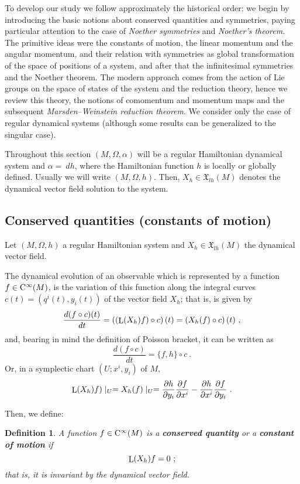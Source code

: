 \documentclass[12pt]{report}
\newtheorem{definition}[teor]{Definition}
\def\derpar#1#2{\frac{\partial{#1}}{\partial{#2}}}
\def\vf{\mathfrak X}
\def\Lie{\mathop{\rm L}\nolimits}
\def\Cinfty{{\rm C}^\infty}
\begin{document}
To develop our study we follow approximately the historical order: 
we begin by introducing the basic notions about conserved quantities 
and symmetries, paying particular attention to the case of 
{\sl Noether symmetries} and {\sl Noether's theorem}. The primitive ideas were the constants of motion, the linear momentum and the angular momentum, and their relation with symmetries as global transformation of the space of positions of a system, and after that the infinitesimal symmetries and the Noether theorem. The modern approach comes from the action of Lie groups on the space of states of the system and the reduction theory, hence we review this theory, the notions of comomentum and momentum maps and the subsequent {\sl Marsden--Weinstein reduction theorem}.
We consider only the case of regular dynamical systems 
(although some results can be generalized to the singular case). 

Throughout this section $(M,\Omega,\alpha)$ will be
a regular Hamiltonian dynamical system and $\alpha=\ d h$, where the Hamiltonian function $h$ is locally or globally defined.
Usually we will write $(M,\Omega,h)$.
Then, $X_h\in\vf_{lh}(M)$ denotes the dynamical vector field
solution to the system.


\subsection{Conserved quantities (constants of motion)}
\label{conquan}


Let $(M,\Omega,h)$ a regular Hamiltonian system and $X_h\in\vf_{lh}(M)$ the dynamical vector field. 

The dynamical evolution of an observable which is represented
by a function $f \in \Cinfty (M)$,
is the variation of this function along the integral curves 
$c(t)=(q^i(t),y_i(t))$ of the vector field $X_h$; that is, is given by
$$
\frac{d (f\circ c)(t)}{d t} = \left(\left(\Lie (X_h)f\right)\circ c\right)(t)=\left(X_h(f)\circ c\right)(t) \ ,
$$
and, bearing in mind the definition of Poisson bracket, it can be written as
$$
\frac{d (f\circ c)}{d t} = \{ f,h \}\circ c \ .
$$
Or, in a symplectic chart $(U;x^i,y_i)$ of $M$, 
$$
\Lie (X_h)f)\mid_U=X_h(f)\mid_U = \derpar{h}{y_i}\derpar{f}{x^i}-\derpar{h}{x^i}\derpar{f}{y_i} \ .
$$

Then, we define:

\begin{definition}
A function $f \in \Cinfty (M)$ is a \textbf{conserved quantity}
or a \textbf{constant of motion} if
$$
\Lie (X_h) f = 0 \ ;
$$
that is, it is invariant by the dynamical vector field.
\end{definition}
\end{document}
